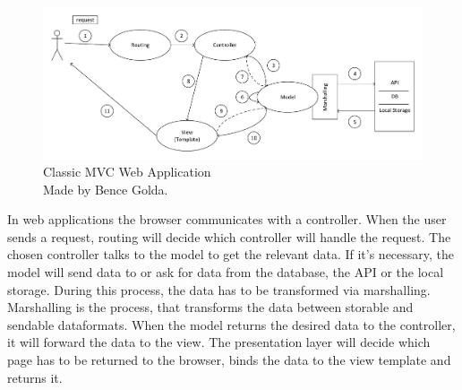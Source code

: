 \begin{figure}[!ht]
	\includegraphics[width=\textwidth]{figures/klasszikus_mvc_webalkalmazas.pdf}
	\caption[Classic MVC Web Application]{Classic MVC Web Application\\Made by Bence Golda.}
	\label{fig:classic-mvc-webapplication}
\end{figure}

In web applications the browser communicates with a controller. When the user sends a request, routing will decide which controller will handle the request. The chosen controller talks to the model to get the relevant data. If it's necessary, the model will send data to or ask for data from the database, the API or the local storage. During this process, the data has to be transformed via marshalling. Marshalling is the process, that transforms the data between storable and sendable dataformats. When the model returns the desired data to the controller, it will forward the data to the view. The presentation layer will decide which page has to be returned to the browser, binds the data to the view template and returns it.


